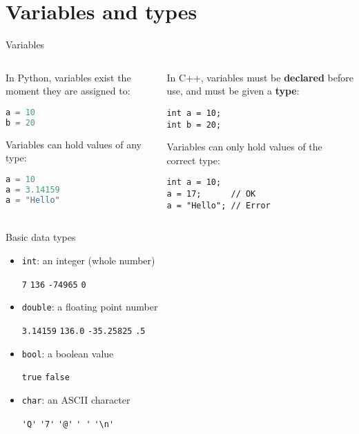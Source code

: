 \part{Variables and types}
\frame{\partpage}

\begin{frame}[fragile]{Variables}
	\begin{columns}[onlytextwidth]
		\begin{column}{0.45\textwidth}
			In Python, variables exist the moment they are assigned to:
			\begin{lstlisting}[language=Python]
a = 10
b = 20
			\end{lstlisting}
			\pause
			Variables can hold values of any type:
			\begin{lstlisting}[language=Python]
a = 10
a = 3.14159
a = "Hello"
			\end{lstlisting}
		\end{column}
		\pause
		\begin{column}{0.45\textwidth}
			In C++, variables must be \textbf{declared} before use, and must be given a \textbf{type}:
			\begin{lstlisting}
int a = 10;
int b = 20;
			\end{lstlisting}
			\pause
			Variables can only hold values of the correct type:
			\begin{lstlisting}
int a = 10;
a = 17;      // OK
a = "Hello"; // Error
			\end{lstlisting}
		\end{column}
	\end{columns}
\end{frame}

\begin{frame}[fragile]{Basic data types}
	\begin{itemize}
		\item \lstinline{int}: an integer (whole number)
			\begin{center} \lstinline{7} \qquad \lstinline{136} \qquad \lstinline{-74965} \qquad \lstinline{0} \end{center}
		\pause
		\item \lstinline{double}: a floating point number
			\begin{center} \lstinline{3.14159} \qquad \lstinline{136.0} \qquad \lstinline{-35.25825} \qquad \lstinline{.5} \end{center}
		\pause
		\item \lstinline{bool}: a boolean value
			\begin{center} \lstinline{true} \qquad \lstinline{false} \end{center}
		\pause
		\item \lstinline{char}: an ASCII character
			\begin{center} \lstinline{'Q'} \qquad \lstinline{'7'} \qquad \lstinline{'@'} \qquad \lstinline{' '} \qquad \lstinline{'\n'} \end{center}
	\end{itemize}
\end{frame}

